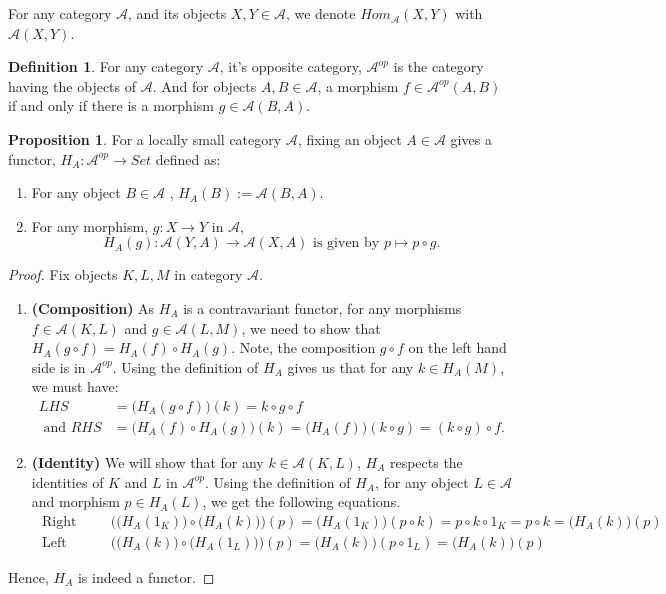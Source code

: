 \documentclass[a4paper]{article}
\theoremstyle{definition}
\newtheorem{definition}[theorem]{Definition}
\newtheorem{prop}[theorem]{Proposition}
\begin{document}
For any category $\mathcal{A}$, and its objects $X,Y\in \mathcal{A} $,
we denote $Hom_{\mathcal{A}}^{\mbox{}}(X,Y)$ with $\mathcal{A} (X,Y)$.

\begin{definition} %
	For any category $\mathcal{A} $, it's opposite category, $\mathcal{A}^{op}$
	is the category having the objects of $\mathcal{A}$.
	And for objects $A,B \in \mathcal{A} $, a morphism $f \in \mathcal{A}^{op} (A,B)$
	if and only if there is a morphism $g \in \mathcal{A}(B,A)$.
\end{definition}
\begin{prop} %
	For a locally small category $\mathcal{A}$, fixing an object $A \in \mathcal{A} $ gives
	a functor, $H_A: \mathcal{A} ^{op} \rightarrow Set$ defined as:
	\begin{enumerate}[label=(\roman*)]
		\item For any object $B \in \mathcal{A} $ , $H_A(B):=\mathcal{A} (B,A)$.
		\item For any morphism, $g : X \rightarrow Y $ in $\mathcal{A}$,
			\[H_A(g): \mathcal{A} (Y,A) \rightarrow \mathcal{A}(X,A)
			\text{ is given by } p \mapsto p \circ g.\]
	\end{enumerate}
\end{prop}
\begin{proof}\setcounter{equation}{0}
	Fix objects $K,L,M$ in category $\mathcal{A}$.
	\begin{enumerate}[label=\Roman*]
		\item \textbf{ (Composition) } As $H_A$ is a contravariant functor, for
			any morphisms $f\in \mathcal{A} (K,L)$ and $g \in
			\mathcal{A}(L,M)$, we need to show that
			$H_A(g \circ f)=H_A(f) \circ H_A(g)$. Note,
			the composition $g\circ f$ on the left hand side is in $\mathcal{A} ^{op}$.
			Using the definition of $H_A$ gives us that for any $k \in H_A(M) $, we must have:
			\begin{align*}
				LHS&=\Big( H_A(g \circ f) \Big) (k)=k\circ g\circ f \\
				\text{ and } RHS&=\Big( H_A(f)\circ H_A(g) \Big) (k)=\Big( H_A(f) \Big) (k \circ g)
			=(k\circ g)\circ f. \end{align*}
		\item \textbf{ (Identity) } We will show that for any
			$k \in \mathcal{A} (K,L)$, $H_A$ respects the identities
			of $K$ and $L$ in $\mathcal{A}^{op}$. Using the definition of $H_A$,
			for any object $L\in \mathcal{A} $ and
			morphism $p \in H_A(L)$, we get the following equations.
			\begin{align*}
				\text{ Right Identity: }& \Big( \big( H_A(1_K) \big) \circ \big( H_A(k) \big) \Big)(p)
				=\big( H_A(1_K) \big) (p \circ k) = p \circ k \circ 1_K=p \circ k = \big( H_A(k) \big)(p)\\
				\text{ Left Identity: }& \Big( \big( H_A(k) \big) \circ \big( H_A(1_L) \big) \Big)(p)
				=\big( H_A(k) \big) (p \circ 1_L) = \big( H_A(k) \big) (p)
			\end{align*}

		\end{enumerate}
		Hence, $H_A$ is indeed a functor.
	\end{proof}
\end{document}
